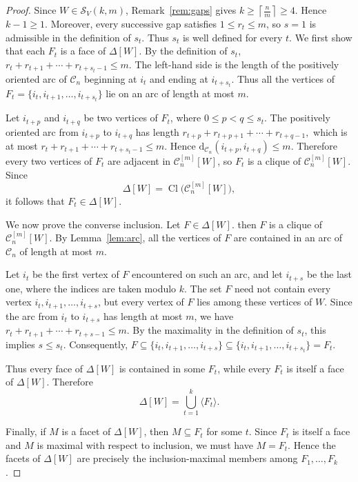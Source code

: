 \documentclass[12pt,reqno]{amsart}
\theoremstyle{definition}
\numberwithin{equation}{section}
\def\C{\mathcal{C}}
\begin{document}
\begin{proof}
Since $W\in\mathcal S_V(k,m)$, Remark~\ref{rem:gaps} gives \( k\geq\left\lceil\frac{n}{m}\right\rceil\geq4. \)
Hence $k-1\geq1$. Moreover, every successive gap satisfies
$1\leq r_t\leq m$, so $s=1$ is admissible in the definition of $s_t$.
Thus $s_t$ is well defined for every $t$.
	We first show that each $F_t$ is a face of $\Delta[W]$. By the
	definition of $s_t$, \( r_t+r_{t+1}+\cdots+r_{t+s_t-1}\leq m. \)
	The left-hand side is the length of the positively oriented arc of
	$\C_n$ beginning at $i_t$ and ending at $i_{t+s_t}$. Thus all the
	vertices of \( F_t=\{i_t,i_{t+1},\ldots,i_{t+s_t}\} \)
	lie on an arc of length at most $m$.
	
	Let $i_{t+p}$ and $i_{t+q}$ be two vertices of $F_t$, where
	$0\leq p<q\leq s_t$. The positively oriented arc from $i_{t+p}$ to
	$i_{t+q}$ has length \( r_{t+p}+r_{t+p+1}+\cdots+r_{t+q-1}, \)
	which is at most \( r_t+r_{t+1}+\cdots+r_{t+s_t-1}\leq m. \)
	Hence \( \mathrm d_{\C_n}(i_{t+p},i_{t+q})\leq m. \)
	Therefore every two vertices of $F_t$ are adjacent in
	$\C_n^{[m]}[W]$, so $F_t$ is a clique of $\C_n^{[m]}[W]$. Since
	\[
	\Delta[W]=\operatorname{Cl}\bigl(\C_n^{[m]}[W]\bigr),
	\]
	it follows that $F_t\in\Delta[W]$.
	
	We now prove the converse inclusion. Let $F\in\Delta[W]$. then $F$ is
	a clique of $\C_n^{[m]}[W]$. By Lemma~\ref{lem:arc}, all the vertices
	of $F$ are contained in an arc of $\C_n$ of length at most $m$.
	
	Let $i_t$ be the first vertex of $F$ encountered on such an arc, and
	let $i_{t+s}$ be the last one, where the indices are taken modulo $k$.
	The set $F$ need not contain every vertex
	$i_t,i_{t+1},\ldots,i_{t+s}$, but every vertex of $F$ lies among these
	vertices of $W$. Since the arc from $i_t$ to $i_{t+s}$ has length at
	most $m$, we have \( r_t+r_{t+1}+\cdots+r_{t+s-1}\leq m. \)
	By the maximality in the definition of $s_t$, this implies
	$s\leq s_t$. Consequently, \( 	F\subseteq
	\{i_t,i_{t+1},\ldots,i_{t+s}\}
	\subseteq
	\{i_t,i_{t+1},\ldots,i_{t+s_t}\}
	=
	F_t. \)
	
	Thus every face of $\Delta[W]$ is contained in some $F_t$, while every
	$F_t$ is itself a face of $\Delta[W]$. Therefore
	\[
	\Delta[W]=\bigcup_{t=1}^{k}\langle F_t\rangle.
	\]
	
	Finally, if $M$ is a facet of $\Delta[W]$, then $M\subseteq F_t$ for
	some $t$. Since $F_t$ is itself a face and $M$ is maximal with respect
	to inclusion, we must have $M=F_t$. Hence the facets of $\Delta[W]$
	are precisely the inclusion-maximal members among
	$F_1,\ldots,F_k$.
\end{proof}
\end{document}
